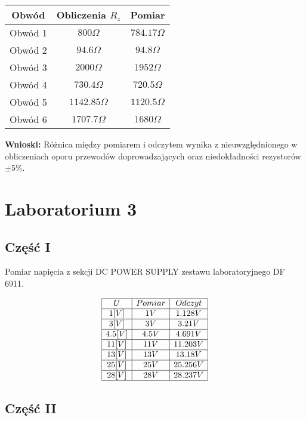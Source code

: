 \documentclass[11pt]{article}
\begin{document}
\begin{center}
\begin{tabular}{|c|c|c|}
\hline
Obwód&Obliczenia $R_{z}$ &Pomiar\\
\hline 
Obwód 1&$800\Omega$& $784.17\Omega$\\
\hline
Obwód 2&$94.6\Omega$& $94.8\Omega$\\
\hline
Obwód 3&$2000\Omega$& $1952\Omega$\\
\hline
Obwód 4&$730.4\Omega$&$720.5\Omega$\\
\hline
Obwód 5&$1142.85\Omega$&$1120.5\Omega$\\
\hline
Obwód 6&$1707.7\Omega$&$1680\Omega$\\
\hline
\end{tabular}
\end{center}

{\bfseries Wnioski:} Różnica między pomiarem i odczytem wynika z nieuwzględnionego w obliczeniach oporu przewodów doprowadzających oraz niedokładności rezystorów\(\pm5\%\). 
\newline
\newline 
\section{Laboratorium 3}
\subsection{Część I}

\begin{center}
Pomiar napięcia z sekcji DC POWER SUPPLY zestawu laboratoryjnego DF 6911.
\end{center}

$$
\begin{array}{|c|c|c|}
\hline
U&Pomiar&Odczyt\\
\hline 
1[V]&1V& 1.128V\\
\hline
3[V]&3V& 3.21V\\
\hline
4.5[V]&4.5V& 4.691V\\
\hline
11[V]&11V& 11.203V\\
\hline
13[V]&13V& 13.18V\\
\hline
25[V]&25V& 25.256V\\
\hline
28[V]&28V& 28.237V\\
\hline
\end{array}
$$

\subsection{Część II}
\end{document}
